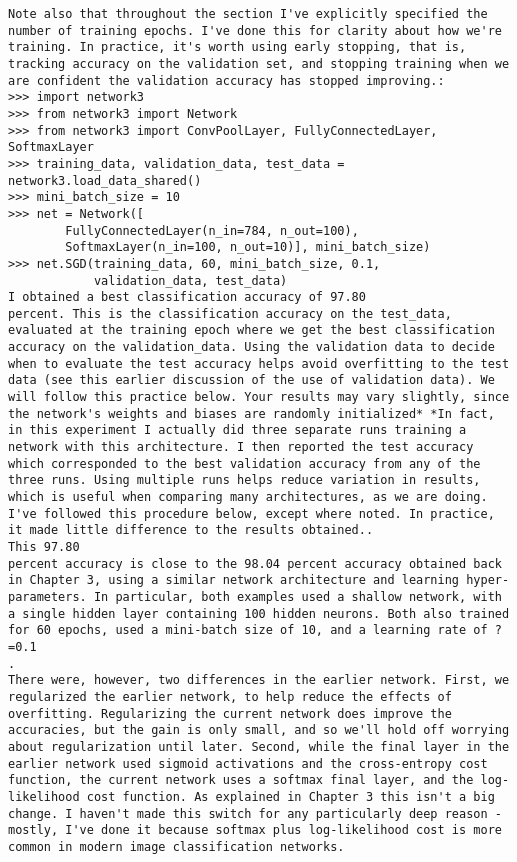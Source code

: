 \begin{lstlisting}
Note also that throughout the section I've explicitly specified the number of training epochs. I've done this for clarity about how we're training. In practice, it's worth using early stopping, that is, tracking accuracy on the validation set, and stopping training when we are confident the validation accuracy has stopped improving.:
>>> import network3
>>> from network3 import Network
>>> from network3 import ConvPoolLayer, FullyConnectedLayer, SoftmaxLayer
>>> training_data, validation_data, test_data = network3.load_data_shared()
>>> mini_batch_size = 10
>>> net = Network([
        FullyConnectedLayer(n_in=784, n_out=100),
        SoftmaxLayer(n_in=100, n_out=10)], mini_batch_size)
>>> net.SGD(training_data, 60, mini_batch_size, 0.1, 
            validation_data, test_data)
I obtained a best classification accuracy of 97.80
percent. This is the classification accuracy on the test_data, evaluated at the training epoch where we get the best classification accuracy on the validation_data. Using the validation data to decide when to evaluate the test accuracy helps avoid overfitting to the test data (see this earlier discussion of the use of validation data). We will follow this practice below. Your results may vary slightly, since the network's weights and biases are randomly initialized* *In fact, in this experiment I actually did three separate runs training a network with this architecture. I then reported the test accuracy which corresponded to the best validation accuracy from any of the three runs. Using multiple runs helps reduce variation in results, which is useful when comparing many architectures, as we are doing. I've followed this procedure below, except where noted. In practice, it made little difference to the results obtained..
This 97.80
percent accuracy is close to the 98.04 percent accuracy obtained back in Chapter 3, using a similar network architecture and learning hyper-parameters. In particular, both examples used a shallow network, with a single hidden layer containing 100 hidden neurons. Both also trained for 60 epochs, used a mini-batch size of 10, and a learning rate of ?=0.1
.
There were, however, two differences in the earlier network. First, we regularized the earlier network, to help reduce the effects of overfitting. Regularizing the current network does improve the accuracies, but the gain is only small, and so we'll hold off worrying about regularization until later. Second, while the final layer in the earlier network used sigmoid activations and the cross-entropy cost function, the current network uses a softmax final layer, and the log-likelihood cost function. As explained in Chapter 3 this isn't a big change. I haven't made this switch for any particularly deep reason - mostly, I've done it because softmax plus log-likelihood cost is more common in modern image classification networks.

\end{lstlisting}
